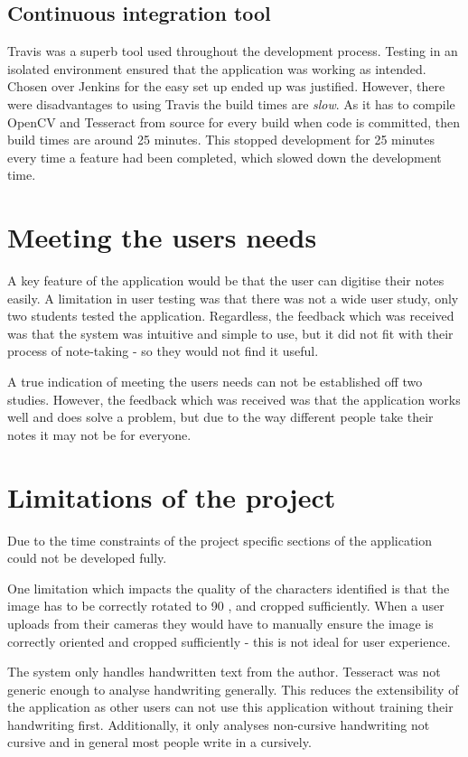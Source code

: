 \subsection{Continuous integration tool}
Travis was a superb tool used throughout the development process. Testing in an isolated environment ensured that the application was working as intended. Chosen over Jenkins for the easy set up ended up was justified. However, there were disadvantages to using Travis the build times are \textit{slow}. As it has to compile OpenCV and Tesseract from source for every build when code is committed, then build times are around 25 minutes. This stopped development for 25 minutes every time a feature had been completed, which slowed down the development time.

\section{Meeting the users needs}
A key feature of the application would be that the user can digitise their notes easily. A limitation in  user testing was that there was not a wide user study, only two students tested the application.  Regardless, the feedback which was received was that the system was intuitive and simple to use, but it did not fit with their process of note-taking - so they would not find it useful.

A true indication of meeting the users needs can not be established off two studies. However, the feedback which was received was that the application works well and does solve a problem, but due to the way different people take their notes it may not be for everyone.

\section{Limitations of the project}
Due to the time constraints of the project specific sections of the application could not be developed fully.

One limitation which impacts the quality of the characters identified is that the image has to be correctly rotated to 90 \textdegree, and cropped sufficiently. When a user uploads from their cameras they would have to manually ensure the image is correctly oriented and cropped sufficiently - this is not ideal for user experience.

The system only handles handwritten text from the author. Tesseract was not generic enough to analyse handwriting generally. This reduces the extensibility of the application as other users can not use this application without training their handwriting first. Additionally, it only analyses non-cursive handwriting not cursive and in general most people write in a cursively.

